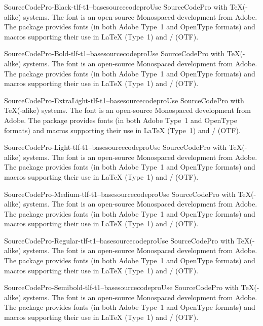 \documentclass{ddltxtyp}
\begin{document}

\begin{package}{SourceCodePro-Black-tlf-t1--base}{sourcecodepro}{Use SourceCodePro with {\TeX}(-alike) systems.}
The font is an open-source Monospaced development from Adobe.
The package provides fonts (in both Adobe Type~1 and OpenType
formats) and macros supporting their use in {\LaTeX} (Type~1) and
{\XeLaTeX}/{\LuaLaTeX} (OTF).
\end{package}
\begin{package}{SourceCodePro-Bold-tlf-t1--base}{sourcecodepro}{Use SourceCodePro with {\TeX}(-alike) systems.}
The font is an open-source Monospaced development from Adobe.
The package provides fonts (in both Adobe Type~1 and OpenType
formats) and macros supporting their use in {\LaTeX} (Type~1) and
{\XeLaTeX}/{\LuaLaTeX} (OTF).
\end{package}
\begin{package}{SourceCodePro-ExtraLight-tlf-t1--base}{sourcecodepro}{Use SourceCodePro with {\TeX}(-alike) systems.}
The font is an open-source Monospaced development from Adobe.
The package provides fonts (in both Adobe Type~1 and OpenType
formats) and macros supporting their use in {\LaTeX} (Type~1) and
{\XeLaTeX}/{\LuaLaTeX} (OTF).
\end{package}
\begin{package}{SourceCodePro-Light-tlf-t1--base}{sourcecodepro}{Use SourceCodePro with {\TeX}(-alike) systems.}
The font is an open-source Monospaced development from Adobe.
The package provides fonts (in both Adobe Type~1 and OpenType
formats) and macros supporting their use in {\LaTeX} (Type~1) and
{\XeLaTeX}/{\LuaLaTeX} (OTF).
\end{package}
\begin{package}{SourceCodePro-Medium-tlf-t1--base}{sourcecodepro}{Use SourceCodePro with {\TeX}(-alike) systems.}
The font is an open-source Monospaced development from Adobe.
The package provides fonts (in both Adobe Type~1 and OpenType
formats) and macros supporting their use in {\LaTeX} (Type~1) and
{\XeLaTeX}/{\LuaLaTeX} (OTF).
\end{package}
\begin{package}{SourceCodePro-Regular-tlf-t1--base}{sourcecodepro}{Use SourceCodePro with {\TeX}(-alike) systems.}
The font is an open-source Monospaced development from Adobe.
The package provides fonts (in both Adobe Type~1 and OpenType
formats) and macros supporting their use in {\LaTeX} (Type~1) and
{\XeLaTeX}/{\LuaLaTeX} (OTF).
\end{package}
\begin{package}{SourceCodePro-Semibold-tlf-t1--base}{sourcecodepro}{Use SourceCodePro with {\TeX}(-alike) systems.}
The font is an open-source Monospaced development from Adobe.
The package provides fonts (in both Adobe Type~1 and OpenType
formats) and macros supporting their use in {\LaTeX} (Type~1) and
{\XeLaTeX}/{\LuaLaTeX} (OTF).
\end{package}
\end{document}
